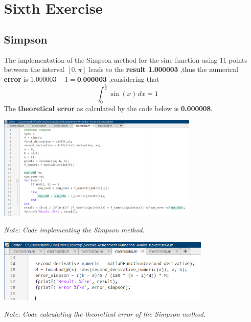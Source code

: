 \documentclass{article}
\begin{document}
\section{Sixth Exercise}
\subsection{Simpson}
The implementation of the Simpson method for the sine function using 11 points between the interval $[0,\pi]$ leads to the \textbf{result 1.000003} ,thus the numerical \textbf{error }is  $1.000003-1=\textbf{0.000003}$ ,considering that \[
\int_{0}^{\frac{\pi}{2}} \sin(x) \, dx = 1
\] 
The \textbf{theoretical error} as calculated by the code below is \textbf{0.000008}.
\begin{tcolorbox}[colback=red!10, colframe=gray!80, width=\textwidth, sharp corners]
    \centering 
    \includegraphics[width=0.75\textwidth,height=0.23\textheight]{Exercise6aCode.png} 

    \vspace{0.1cm}
    \small\textit{Note: Code implementing the Simpson method. }
\end{tcolorbox}

\begin{tcolorbox}[colback=red!10, colframe=gray!80, width=\textwidth, sharp corners]
    \centering 
    \includegraphics[width=0.8\textwidth,height=0.12\textheight]{Exercise6aError.png} 

    \vspace{0.1cm}
    \small\textit{Note: Code calculating the theoretical error of the Simpson method. }
\end{tcolorbox}
\end{document}
